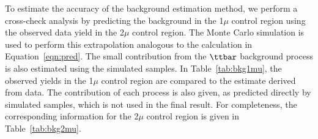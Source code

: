 To estimate the accuracy of the background estimation method, we perform a cross-check 
analysis by predicting the background in the 1$\mu$ control region using the observed data yield
in the 2$\mu$ control region. The Monte Carlo simulation is used to perform this extrapolation
analogous to the calculation in Equation~\ref{eqn:pred}.
The small contribution from the $\ttbar$ background process is also estimated using the simulated
samples. In Table~\ref{tab:bkg1mu}, the observed yields in the 1$\mu$ control region
are compared to the estimate derived from data. The contribution of each process is also given,
as predicted directly by simulated samples, which is not used in the final result. 
For completeness, the corresponding information for the 2$\mu$ control region is given in Table~\ref{tab:bkg2mu}.


\begin{table}[htb]
\centering
{}
\end{table}

